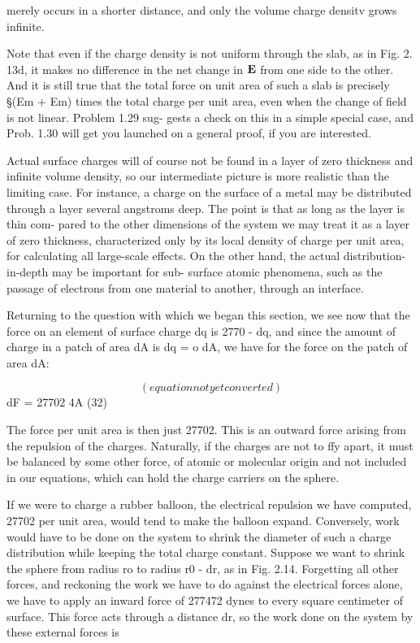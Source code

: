merely occurs in a shorter distance, and only the volume charge
densitv grows infinite.

 

Note that even if the charge density is not uniform through the slab,
as in Fig. 2. 13d, it makes no difference in the net change in $\mathbf{E}$ from one
side to the other. And it is still true that the total force on unit area
of such a slab is precisely §(Em + Em) times the total charge per unit
area, even when the change of field is not linear. Problem 1.29 sug-
gests a check on this in a simple special case, and Prob. 1.30 will get
you launched on a general proof, if you are interested.

Actual surface charges will of course not be found in a layer of zero
thickness and infinite volume density, so our intermediate picture is
more realistic than the limiting case. For instance, a charge on the
surface of a metal may be distributed through a layer several
angstroms deep. The point is that as long as the layer is thin com-
pared to the other dimensions of the system we may treat it as a layer
of zero thickness, characterized only by its local density of charge
per unit area, for calculating all large-scale effects. On the other
hand, the actual distribution-in-depth may be important for sub-
surface atomic phenomena, such as the passage of electrons from one
material to another, through an interface.

Returning to the question with which we began this section, we see
now that the force on an element of surface charge dq is 2770 - dq, and
since the amount of charge in a patch of area dA is dq = o dA, we
have for the force on the patch of area dA:

\begin{equation}
(equation not yet converted)
\end{equation}
dF = 27702 4A (32)

The force per unit area is then just 27702. This is an outward force
arising from the repulsion of the charges. Naturally, if the charges
are not to ffy apart, it must be balanced by some other force, of atomic
or molecular origin and not included in our equations, which can hold
the charge carriers on the sphere.

If we were to charge a rubber balloon, the electrical repulsion we
have computed, 27702 per unit area, would tend to make the balloon
expand. Conversely, work would have to be done on the system to
shrink the diameter of such a charge distribution while keeping the
total charge constant. Suppose we want to shrink the sphere from
radius ro to radius r0 - dr, as in Fig. 2.14. Forgetting all other
forces, and reckoning the work we have to do against the electrical
forces alone, we have to apply an inward force of 277472 dynes to every
square centimeter of surface. This force acts through a distance dr,
so the work done on the system by these external forces is


